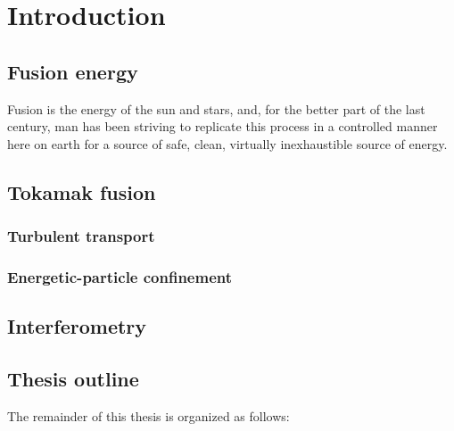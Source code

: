 \chapter{Introduction}


\section{Fusion energy}
Fusion is the energy of the sun and stars, and,
for the better part of the last century,
man has been striving to replicate this process
in a controlled manner here on earth
for a source of safe, clean, virtually inexhaustible source of energy.


\section{Tokamak fusion}
\subsection{Turbulent transport}
\subsection{Energetic-particle confinement}


\section{Interferometry}


\section{Thesis outline}
The remainder of this thesis is organized as follows:

